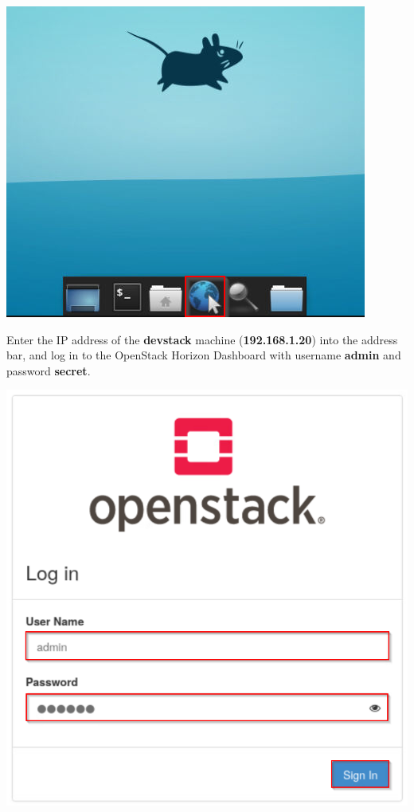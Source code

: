 \documentclass[letterpaper, 12pt]{article}
\begin{document}
\begin{enumerate}
\begin{labstep}
        \begin{center}
            \includegraphics[scale=0.8]{images/part1/step3.png}
        \end{center}
    \end{labstep}

    \begin{labstep}
        Enter the IP address of the \textbf{devstack} machine (\textbf{192.168.1.20}) into the address bar, and log in to the OpenStack Horizon Dashboard with username \textbf{admin} and password \textbf{secret}.

        \begin{center}
            \includegraphics[scale=0.5]{images/part1/step4.png}
        \end{center}
    \end{labstep}


\end{enumerate}
\end{document}
